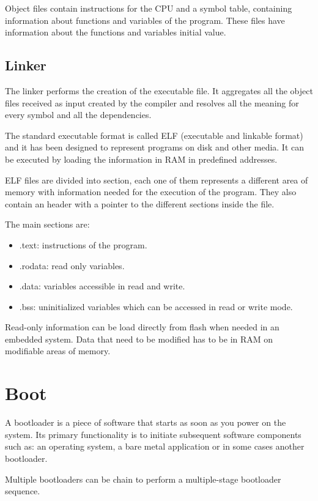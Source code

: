 Object files contain instructions for the CPU and a symbol table, containing
information about functions and variables of the program.
These files have information about the functions and variables initial value.

\subsection{Linker}

The linker performs the creation of the executable file. It aggregates all the
object files received as input created by the compiler and resolves all the
meaning for every symbol and all the dependencies.

The standard executable format is called ELF (executable and linkable format)
and it has been designed to represent programs on disk and other media.
It can be executed by loading the information in RAM in predefined addresses.

ELF files are divided into section, each one of them represents a different
area of memory with information needed for the execution of the program.
They also contain an header with a pointer to the different sections inside
the file.

The main sections are:

\begin{itemize}
    \item .text: instructions of the program.
    \item .rodata: read only variables.
    \item .data: variables accessible in read and write.
    \item .bss: uninitialized variables which can be accessed in read or write
                mode.
\end{itemize}

Read-only information can be load directly from flash when needed in an
embedded system.
Data that need to be modified has to be in RAM on modifiable areas of memory.

\section{Boot}

A bootloader is a piece of software that starts as soon as you power on the
system.
Its primary functionality is to initiate subsequent software components such
as: an operating system, a bare metal application or in some cases another
bootloader.

Multiple bootloaders can be chain to perform a multiple-stage bootloader
sequence.

